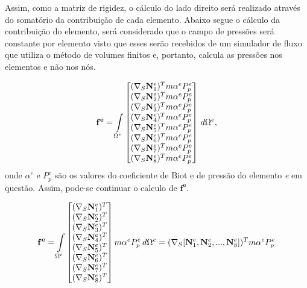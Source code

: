 Assim, como a matriz de rigidez, o cálculo do lado direito será realizado através do somatório da contribuição de cada elemento. Abaixo segue o cálculo da contribuição do elemento, será considerado que o campo de pressões será constante por elemento visto que esses serão recebidos de um simulador de fluxo que utiliza o método de volumes finitos e, portanto, calcula as pressões nos elementos e não nos nós.

\begin{equation}
    \mathbf{f^e} = \omeeint{\begin{bmatrix}
(\sopnabla \basefunctionelem[1])^T m \alpha^e P^e_p
\\
(\sopnabla \basefunctionelem[2])^T m \alpha^e P^e_p
\\
(\sopnabla \basefunctionelem[3])^T m \alpha^e P^e_p
\\
(\sopnabla \basefunctionelem[4])^T m \alpha^e P^e_p
\\
(\sopnabla \basefunctionelem[5])^T m \alpha^e P^e_p
\\
(\sopnabla \basefunctionelem[6])^T m \alpha^e P^e_p
\\
(\sopnabla \basefunctionelem[7])^T m \alpha^e P^e_p
\\
(\sopnabla \basefunctionelem[8])^T m \alpha^e P^e_p
\end{bmatrix}},
\end{equation}
onde $\alpha^e$ e $P^e_p$ são os valores do coeficiente de Biot e de pressão do elemento \textit{e} em questão. Assim, pode-se continuar o calculo de $\mathbf{f^e}$.


\begin{equation}
\mathbf{f^e} = \omeeint{\begin{bmatrix}
(\sopnabla \basefunctionelem[1])^T
\\
(\sopnabla \basefunctionelem[2])^T
\\
(\sopnabla \basefunctionelem[3])^T
\\
(\sopnabla \basefunctionelem[4])^T
\\
(\sopnabla \basefunctionelem[5])^T
\\
(\sopnabla \basefunctionelem[6])^T
\\
(\sopnabla \basefunctionelem[7])^T
\\
(\sopnabla \basefunctionelem[8])^T
\end{bmatrix} m \alpha^e P^e_p }
 = (\sopnabla [\basefunctionelem[1], \basefunctionelem[2], ..., \basefunctionelem[8]])^T m \alpha^e P^e_p
\end{equation}

